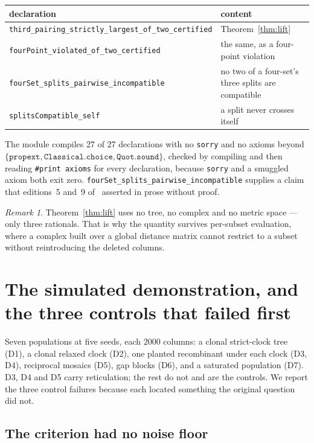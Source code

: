 \documentclass[11pt,a4paper]{article}
\theoremstyle{definition}
\theoremstyle{remark}
\newtheorem{remark}{Remark}[section]
\begin{document}
\begin{center}\footnotesize
\begin{tabular}{@{}ll@{}}
\toprule
declaration & content \\
\midrule
\texttt{third\_pairing\_strictly\_largest\_of\_two\_certified}
  & Theorem~\ref{thm:lift} \\
\texttt{fourPoint\_violated\_of\_two\_certified}
  & the same, as a four-point violation \\
\texttt{fourSet\_splits\_pairwise\_incompatible}
  & no two of a four-set's three splits are compatible \\
\texttt{splitsCompatible\_self}
  & a split never crosses itself \\
\bottomrule
\end{tabular}
\end{center}

The module compiles 27 of 27 declarations with no \texttt{sorry} and no axioms
beyond $\{\texttt{propext}, \texttt{Classical.choice}, \texttt{Quot.sound}\}$,
checked by compiling and then reading \texttt{\#print axioms} for every
declaration, because \texttt{sorry} and a smuggled axiom both exit zero.
\texttt{fourSet\_splits\_pairwise\_incompatible} supplies a claim that editions~5
and~9 of~\cite{paperf,textbook} asserted in prose without proof.

\begin{remark}
Theorem~\ref{thm:lift} uses no tree, no complex and no metric space --- only
three rationals. That is why the quantity survives per-subset evaluation, where a
complex built over a global distance matrix cannot restrict to a subset without
reintroducing the deleted columns.
\end{remark}

\section{The simulated demonstration, and the three controls that failed first}
\label{sec:simulated}

Seven populations at five seeds, each $2000$ columns: a clonal strict-clock tree
(D1), a clonal relaxed clock (D2), one planted recombinant under each clock
(D3, D4), reciprocal mosaics (D5), gap blocks (D6), and a saturated population
(D7). D3, D4 and D5 carry reticulation; the rest do not and are the controls. We
report the three control failures because each located something the original
question did not.

\subsection{The criterion had no noise floor}\label{sec:nofloor}
\end{document}
